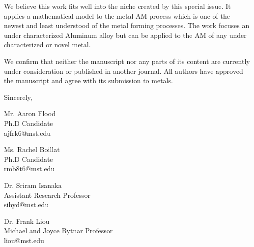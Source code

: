 \documentclass{letter}
\begin{document}
We believe this work fits well into the niche created by this special issue.  It applies a mathematical model to the metal AM process which is one of the newest and least understood of the metal forming processes.  The work focuses an under characterized Aluminum alloy but can be applied to the AM of any under characterized or novel metal.

We confirm that neither the manuscript nor any parts of its content are currently under consideration or published in another journal.
All authors have approved the manuscript and agree with its submission to metals.

\smallskip %

Sincerely,

Mr. Aaron Flood\\
Ph.D Candidate\\
ajfrk6@mst.edu

Ms. Rachel Boillat\\
Ph.D Candidate\\
rmb8t6@mst.edu

Dr. Sriram Isanaka\\
Assistant Research Professor\\
sihyd@mst.edu


Dr. Frank Liou\\
Michael and Joyce Bytnar Professor\\
liou@mst.edu



\end{document}
